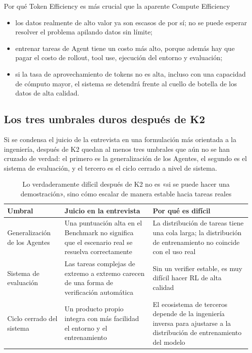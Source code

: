 \documentclass[a4paper]{article}
\begin{document}
\begin{importantbox}{Por qué Token Efficiency es más crucial que la aparente Compute Efficiency}
\begin{itemize}
    \item los datos realmente de alto valor ya son escasos de por sí; no se puede esperar resolver el problema apilando datos sin límite;
    \item entrenar tareas de Agent tiene un costo más alto, porque además hay que pagar el costo de rollout, tool use, ejecución del entorno y evaluación;
    \item si la tasa de aprovechamiento de tokens no es alta, incluso con una capacidad de cómputo mayor, el sistema se detendrá frente al cuello de botella de los datos de alta calidad.
\end{itemize}
\end{importantbox}

\subsection{Los tres umbrales duros después de K2}
Si se condensa el juicio de la entrevista en una formulación más orientada a la ingeniería, después de K2 quedan al menos tres umbrales que aún no se han cruzado de verdad: el primero es la generalización de los Agentes, el segundo es el sistema de evaluación, y el tercero es el ciclo cerrado a nivel de sistema.

\begin{table}[H]
\centering
\begin{tabular}{p{2.8cm}p{4.2cm}p{4.5cm}}
\toprule
\textbf{Umbral} & \textbf{Juicio en la entrevista} & \textbf{Por qué es difícil} \\
\midrule
Generalización de los Agentes & Una puntuación alta en el Benchmark no significa que el escenario real se resuelva correctamente & La distribución de tareas tiene una cola larga; la distribución de entrenamiento no coincide con el uso real \\
Sistema de evaluación & Las tareas complejas de extremo a extremo carecen de una forma de verificación automática & Sin un verifier estable, es muy difícil hacer RL de alta calidad \\
Ciclo cerrado del sistema & Un producto propio integra con más facilidad el entorno y el entrenamiento & El ecosistema de terceros depende de la ingeniería inversa para ajustarse a la distribución de entrenamiento del modelo \\
\bottomrule
\end{tabular}
\caption{Lo verdaderamente difícil después de K2 no es «si se puede hacer una demostración», sino cómo escalar de manera estable hacia tareas reales}
\end{table}
\end{document}
